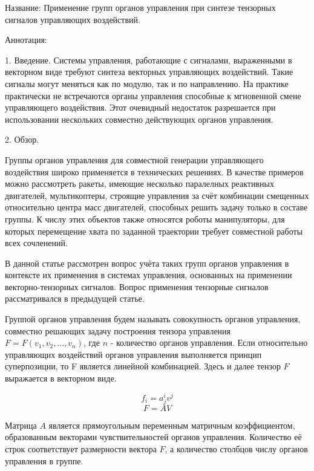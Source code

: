 
Название:
Применение групп органов управления при синтезе тензорных сигналов управляющих воздействий.

Аннотация:


1. Введение.
Системы управления, работающие с сигналами, выраженными в векторном виде требуют синтеза векторных управляющих воздействий. Такие сигналы могут меняться как по модулю, так и по направлению. На практике практически не встречаются органы управления способные к мгновенной смене управляющего воздействия. Этот очевидный недостаток разрешается при использовании нескольких совместно действующих органов управления.


2. Обзор.

Группы органов управления для совместной генерации управляющего воздействия широко применяется в технических решениях. В качестве примеров можно рассмотреть ракеты, имеющие несколько паралелных реактивных двигателей, мультикоптеры, строящие управления за счёт комбинации смещенных относительно центра масс двигателей, способных решить задачу только в составе группы. К числу этих объектов также относятся роботы манипуляторы, для которых перемещение хвата по заданной траектории требует совместной работы всех сочленений.

В данной статье рассмотрен вопрос учёта таких групп органов управления в контексте их применения в системах управления, основанных на применении векторно-тензорных сигналов. Вопрос применения тензорные сигналов рассматривался в предыдущей статье.









Группой органов управления будем называть совокупность органов управления, совместно решающих задачу построения тензора управления $F = F(v_1, v_2, ..., v_n)$, где $n$ - количество органов управления. Если относительно управляющих воздействий органов управления выполняется принцип суперпозиции, то F является линейной комбинацией. Здесь и далее тензор $F$ выражается в векторном виде. 

\begin{equation}f_i=a^i_jv^j\end{equation}
\begin{equation} \label{lincomb}  F=AV\end{equation}

Матрица $A$ является прямоугольным переменным матричным коэффициентом, образованным векторами чувствительностей органов управления. Количество её строк соответствует размерности вектора $F$, а количество столбцов числу органов управления в группе.

